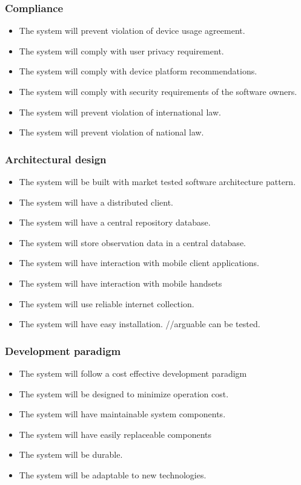 \subsubsection{Compliance}
		\begin{itemize}
		     \item The system will prevent violation of device usage agreement.
             \item The system will comply with user privacy requirement.
             \item The system will comply with device platform recommendations.
             \item The system will comply with security requirements of the software owners.
             \item The system will prevent violation of international law.
             \item The system will prevent violation of national law.

	    \end{itemize}
\subsubsection{Architectural design}
    \begin{itemize}
        \item The system will be built with market tested software architecture pattern.
        \item The system will have a distributed client.
        \item The system will have a central repository database.
        \item The system will store observation data in a central database.
        \item The system will have interaction with mobile client applications.
        \item The system will have interaction with mobile handsets
        \item The system will use reliable internet collection.
        \item The system will have easy installation. //arguable can be tested.

    \end{itemize}
\subsubsection{Development paradigm}
    \begin{itemize}
        \item The system will follow a cost effective development paradigm
        \item The system will be designed to minimize operation cost.
        \item The system will have maintainable system components.
        \item The system will have easily replaceable components
        \item The system will be durable.
        \item The system will be adaptable to new technologies.

    \end{itemize}
